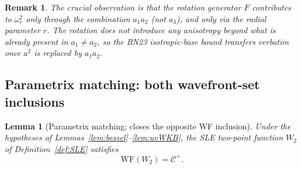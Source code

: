 \documentclass[12pt, a4paper]{article}
\newtheorem{lemma}[theorem]{Lemma}
\newtheorem{remark}[theorem]{Remark}
\theoremstyle{remark}
\newcommand{\WF}{\mathrm{WF}}
\begin{document}
\begin{remark}\label{rem:rotation-non-issue}
  The crucial observation is that the rotation generator $F$
  contributes to $\omega_r^2$ \emph{only} through the combination
  $a_1 a_2$ (not $a_3$), and only via the radial parameter $r$.
  The rotation does \emph{not} introduce any anisotropy beyond what is
  already present in $a_1 \neq a_2$, so the BN23 isotropic-base bound
  transfers verbatim once $a^2$ is replaced by $a_1 a_2$.
\end{remark}

\subsection{Parametrix matching: both wavefront-set inclusions}

\begin{lemma}[Parametrix matching; closes the opposite WF inclusion]
  \label{lem:parametrix}
  Under the hypotheses of Lemmas~\ref{lem:bessel}--\ref{lem:uvWKB}, the
  SLE two-point function $W_2$ of Definition~\ref{def:SLE} satisfies
  \begin{equation}\label{eq:WF-equality}
    \WF(W_2) = \mathcal{C}^+.
  \end{equation}
\end{lemma}
\end{document}
